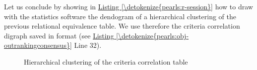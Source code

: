\documentclass[a4paper,12pt,english]{sphinxhowto}
\let\sphinxpxdimen\pdfpxdimen\else\newdimen\sphinxpxdimen
\begin{document}
\sphinxAtStartPar
Let us conclude by showing in \hyperref[\detokenize{pearls:r-session}]{Listing \ref{\detokenize{pearls:r-session}}} how to draw with the  statistics software the dendogram of a hierarchical clustering of the previous relational equivalence table. We use therefore the criteria correlation digraph   saved in  format (see \hyperref[\detokenize{pearls:obj-outrankingconsensus}]{Listing \ref{\detokenize{pearls:obj-outrankingconsensus}}} Line 32).
\def\sphinxLiteralBlockLabel{\label{\detokenize{pearls:r-session}}}
\begin{sphinxVerbatim}[commandchars=\\\{\},numbers=left,firstnumber=1,stepnumber=1]
\end{sphinxVerbatim}

\begin{figure}[H]
\centering
\capstart

\noindent\sphinxincludegraphics[width=500\sphinxpxdimen]{{dendogram}.png}
\caption{Hierarchical clustering of the criteria correlation table}\label{\detokenize{pearls:dendogram}}\end{figure}
\end{document}
